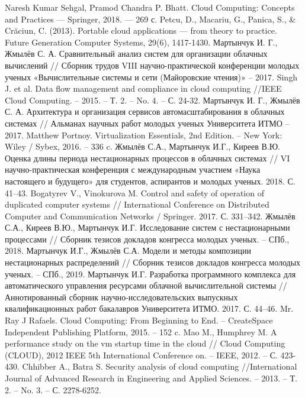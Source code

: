 \begin{thebibliography}{40}
Naresh Kumar Sehgal, Pramod Chandra P. Bhatt. Cloud Computing: Concepts and Practices --- Springer, 2018. --- 269 с.
Petcu, D., Macariu, G., Panica, S., \& Crăciun, C. (2013). Portable cloud applications --- from theory to practice. Future Generation Computer Systems, 29(6), 1417-1430.
Мартынчук И. Г., Жмылёв С. А. Сравнительный анализ систем для организации облачных вычислений // Сборник трудов VIII научно-практической конференции молодых ученых «Вычислительные системы и сети (Майоровские чтения)» – 2017.
Singh J. et al. Data flow management and compliance in cloud computing //IEEE Cloud Computing. – 2015. – Т. 2. – No. 4. – С. 24-32.
Мартынчук И. Г., Жмылёв С. А. Архитектура и организация сервисов автомасштабирования в облачных системах // Альманах научных работ молодых ученых Университета ИТМО – 2017.
Matthew Portnoy. Virtualization Essentials, 2nd Edition. – New York: Wiley / Sybex, 2016. – 336 c.
Жмылёв С.А., Мартынчук И.Г., Киреев В.Ю. Оценка длины периода нестационарных процессов в облачных системах // VI научно-практическая конференция с международным участием «Наука настоящего и будущего» для студентов, аспирантов и молодых ученых. 2018. С. 41–43.
Bogatyrev V., Vinokurova M. Control and safety of operation of duplicated computer systems // International Conference on Distributed Computer and Communication Networks / Springer. 2017. С. 331–342.
Жмылёв С.А., Киреев В.Ю., Мартынчук И.Г. Исследование систем с нестационарными процессами // Сборник тезисов докладов конгресса молодых ученых. – СПб., 2018.
Мартынчук И.Г., Жмылёв С.А. Модели и методы композиции нестационарных распределений // Сборник тезисов докладов конгресса молодых ученых. – СПб., 2019.
Мартынчук И.Г. Разработка программного комплекса для автоматического управления ресурсами облачной вычислительной системы // Аннотированный сборник научно-исследовательских выпускных квалификационных работ бакалавров Университета ИТМО. 2017. С. 44–46.
Mr. Ray J Rafaels. Cloud Computing: From Beginning to End. – CreateSpace Independent Publishing Platform, 2015. – 152 c.
Mao M., Humphrey M. A performance study on the vm startup time in the cloud // Cloud Computing (CLOUD), 2012 IEEE 5th International Conference on. – IEEE, 2012. – С. 423-430.
Chhibber A., Batra S. Security analysis of cloud computing //International Journal of Advanced Research in Engineering and Applied Sciences. – 2013. – Т. 2. – No. 3. – С. 2278-6252.

\end{thebibliography}

